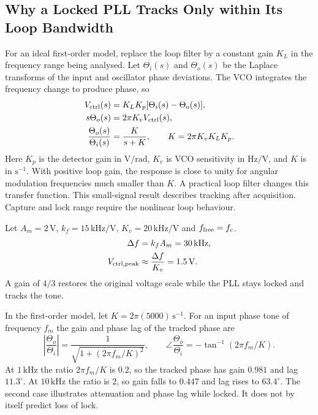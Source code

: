 \documentclass[12pt,a4paper]{article}
\begin{document}
\begin{samepage}
\subsection{Why a Locked PLL Tracks Only within Its Loop Bandwidth}
For an ideal first-order model, replace the loop filter by a constant gain $K_L$ in the frequency range being analysed. Let $\Theta_i(s)$ and $\Theta_o(s)$ be the Laplace transforms of the input and oscillator phase deviations. The VCO integrates the frequency change to produce phase, so
\[
\begin{aligned}
 V_{\rm ctrl}(s)&=K_LK_p[\Theta_i(s)-\Theta_o(s)],\\
 s\Theta_o(s)&=2\pi K_v V_{\rm ctrl}(s),\\
 \frac{\Theta_o(s)}{\Theta_i(s)}
   &=\frac{K}{s+K},\qquad K=2\pi K_vK_LK_p .
\end{aligned}
\]
Here $K_p$ is the detector gain in $\mathrm{V/rad}$, $K_v$ is VCO sensitivity in $\mathrm{Hz/V}$, and $K$ is in $\mathrm{s^{-1}}$. With positive loop gain, the response is close to unity for angular modulation frequencies much smaller than $K$. A practical loop filter changes this transfer function. This small-signal result describes tracking after acquisition. Capture and lock range require the nonlinear loop behaviour.
\par
\end{samepage}

\begin{tcolorbox}[examplebox, title={Demodulate FM with a Locked PLL}]
Let $A_m=2\,\mathrm V$, $k_f=15\,\mathrm{kHz/V}$, $K_v=20\,\mathrm{kHz/V}$ and $f_{\rm free}=f_c$.
\[
\begin{aligned}
 \Delta f &= k_fA_m=30\,\mathrm{kHz},\\
 V_{\rm ctrl,peak} &\approx \frac{\Delta f}{K_v}=1.5\,\mathrm V.
\end{aligned}
\]
A gain of $4/3$ restores the original voltage scale while the PLL stays locked and tracks the tone.
\end{tcolorbox}

\begin{tcolorbox}[examplebox, title={Check PLL Tracking for Two Audio Frequencies}]
In the first-order model, let $K=2\pi(5000)\,\mathrm{s^{-1}}$. For an input phase tone of frequency $f_m$ the gain and phase lag of the tracked phase are
\[
 \left|\frac{\Theta_o}{\Theta_i}\right|
    =\frac{1}{\sqrt{1+(2\pi f_m/K)^2}},\qquad
 \angle\frac{\Theta_o}{\Theta_i}=-\tan^{-1}(2\pi f_m/K).
\]
At $1\,\mathrm{kHz}$ the ratio $2\pi f_m/K$ is $0.2$, so the tracked phase has gain $0.981$ and lag $11.3^\circ$. At $10\,\mathrm{kHz}$ the ratio is $2$, so gain falls to $0.447$ and lag rises to $63.4^\circ$. The second case illustrates attenuation and phase lag while locked. It does not by itself predict loss of lock.
\end{tcolorbox}
\end{document}
